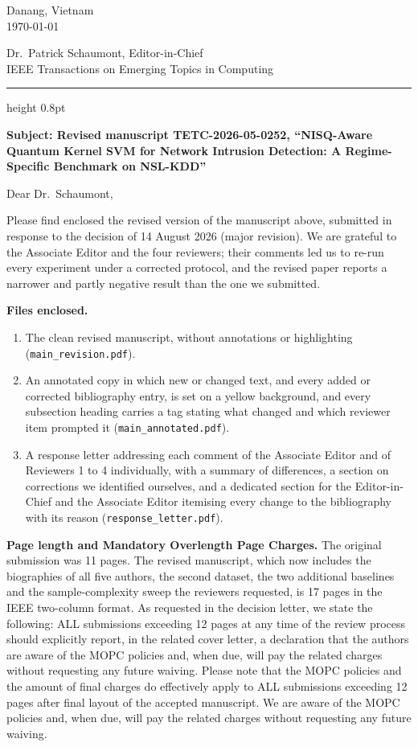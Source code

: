 \documentclass[11pt,a4paper]{article}
\begin{document}
\begin{flushright}
Danang, Vietnam\\
\today
\end{flushright}

Dr.\ Patrick Schaumont, Editor-in-Chief\\
IEEE Transactions on Emerging Topics in Computing

\vspace{6pt}
{\color{rulegray}\hrule height 0.8pt}
\vspace{8pt}

\textbf{Subject: Revised manuscript TETC-2026-05-0252, ``NISQ-Aware Quantum
Kernel SVM for Network Intrusion Detection: A Regime-Specific Benchmark on
NSL-KDD''}

Dear Dr.\ Schaumont,

Please find enclosed the revised version of the manuscript above, submitted in
response to the decision of 14 August 2026 (major revision). We are grateful to
the Associate Editor and the four reviewers; their comments led us to re-run
every experiment under a corrected protocol, and the revised paper reports a
narrower and partly negative result than the one we submitted.

\textbf{Files enclosed.}
\begin{enumerate}[leftmargin=1.6em,itemsep=2pt]
  \item The clean revised manuscript, without annotations or highlighting
    (\texttt{main\_revision.pdf}).
  \item An annotated copy in which new or changed text, and every added or
    corrected bibliography entry, is set on a yellow background, and every
    subsection heading carries a tag stating what changed and which reviewer
    item prompted it (\texttt{main\_annotated.pdf}).
  \item A response letter addressing each comment of the Associate Editor and
    of Reviewers 1 to 4 individually, with a summary of differences, a section
    on corrections we identified ourselves, and a dedicated section for the
    Editor-in-Chief and the Associate Editor itemising every change to the
    bibliography with its reason (\texttt{response\_letter.pdf}).
\end{enumerate}

\textbf{Page length and Mandatory Overlength Page Charges.} The original
submission was 11 pages. The revised manuscript, which now includes the
biographies of all five authors, the second dataset, the two additional
baselines and the sample-complexity sweep the reviewers requested, is 17 pages
in the IEEE two-column format. As requested in the decision letter, we state
the following: ALL submissions exceeding 12 pages at any time of the review
process should explicitly report, in the related cover letter, a declaration
that the authors are aware of the MOPC policies and, when due, will pay the
related charges without requesting any future waiving. Please note that the
MOPC policies and the amount of final charges do effectively apply to ALL
submissions exceeding 12 pages after final layout of the accepted manuscript.
We are aware of the MOPC policies and, when due, will pay the related charges
without requesting any future waiving.
\end{document}
